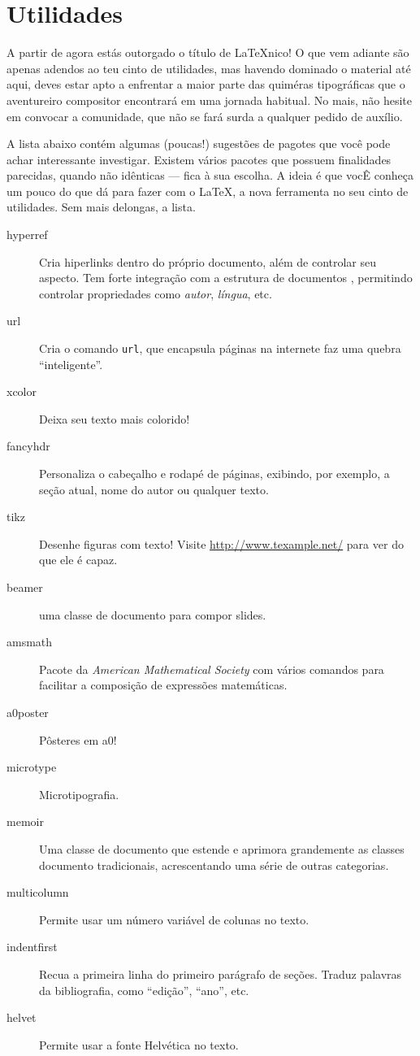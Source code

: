 \section{Utilidades}

A partir de agora estás outorgado o título de \LaTeX nico! O que vem
adiante são apenas adendos ao teu cinto de utilidades, mas havendo
dominado o material até aqui, deves estar apto a enfrentar a maior
parte das quiméras tipográficas que o aventureiro compositor
encontrará em uma jornada habitual. No mais, não hesite em convocar a
comunidade, que não se fará surda a qualquer pedido de auxílio.

A lista abaixo contém algumas (poucas!) sugestões de pagotes que você pode achar
interessante investigar. Existem vários pacotes que possuem
finalidades parecidas, quando não idênticas --- fica à sua escolha. A
ideia é que vocÊ conheça um pouco do que dá para fazer com o \LaTeX, a
nova ferramenta no seu cinto de utilidades. Sem mais delongas, a
lista.

\begin{description}
  \item[hyperref] Cria hiperlinks dentro do
    próprio documento, além de controlar seu aspecto. Tem forte
    integração com a estrutura de documentos ,
    permitindo controlar propriedades como \emph{autor},
    \emph{língua}, etc.
  \item[url] Cria o comando \verb'url', que encapsula páginas na
    internete faz uma quebra ``inteligente''.
  \item[xcolor] Deixa seu texto mais colorido!
  \item[fancyhdr] Personaliza o cabeçalho e rodapé de páginas,
    exibindo, por exemplo, a seção atual, nome do autor ou qualquer
    texto.
  \item[tikz] Desenhe figuras com texto! Visite
    \url{http://www.texample.net/} para ver do que ele é capaz.
  \item[beamer] uma classe de documento para compor slides.
  \item[amsmath] Pacote da \emph{American Mathematical Society} com
    vários comandos para facilitar a composição de expressões
    matemáticas.
  \item[a0poster] Pôsteres em a0!
  \item[microtype] Microtipografia.
  \item[memoir] Uma classe de documento que estende e aprimora
    grandemente as classes documento tradicionais, acrescentando uma
    série de outras categorias.
  \item[multicolumn] Permite usar um número variável de colunas no
    texto.
  \item[indentfirst] Recua a primeira linha do primeiro parágrafo de
    seções.
  \itema[belbib] Traduz palavras da bibliografia, como ``edição'',
  ``ano'', etc.
  \item[helvet] Permite usar a fonte Helvética no texto. 
\end{description}
